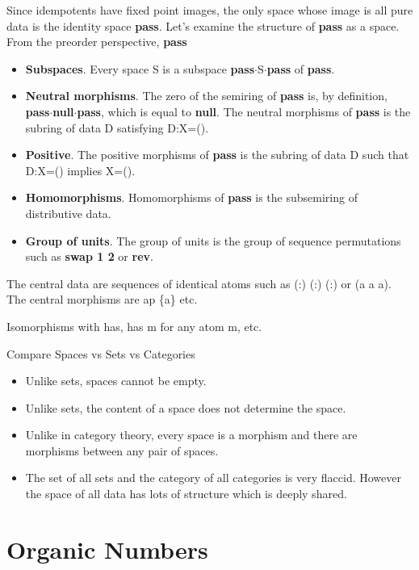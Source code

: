 \documentclass[11pt]{article}
\begin{document}
     Since idempotents have fixed point images, the only space whose image is all pure data is the identity space {\bf pass}.  Let's examine the structure of {\bf pass} as a space.  From the preorder 
 perspective, {\bf pass}
 \begin{itemize}
 \item{{\bf Subspaces}. Every space S is a subspace {\bf pass}$\cdot$S$\cdot${\bf pass} of {\bf pass}.}
 \item{{\bf Neutral morphisms}. The zero of the semiring of {\bf pass} is, by definition, {\bf pass}$\cdot${\bf null}$\cdot${\bf pass}, which 
 is equal to {\bf null}.  The neutral morphisms of {\bf pass} is the subring of data D satisfying D:X=(). }
 \item{{\bf Positive}. The positive morphisms of {\bf pass} is the subring of data D such that D:X=() implies X=().}
 \item{{\bf Homomorphisms}.  Homomorphisms of {\bf pass} is the subsemiring of distributive data}.
 \item{{\bf Group of units}.  The group of units is the group of sequence permutations such as {\bf swap 1 2} or {\bf rev}.}
 \end{itemize}

The central data are sequences of identical atoms such as (:) (:) (:) or (a a a).  The central morphisms are ap \{a\} etc.  

Isomorphisms with has, has m for any atom m, etc. 

Compare Spaces vs Sets vs Categories 
\begin{itemize}
\item{Unlike sets, spaces cannot be empty.}
\item{Unlike sets, the content of a space does not determine the space.}
\item{Unlike in category theory, every space is a morphism and there are morphisms between any pair of spaces.}  
\item{The set of all sets and the category of all categories is very flaccid.  However the space of all data has lots of structure which is deeply shared.}
\end{itemize}


\section{Organic Numbers}
\end{document}
